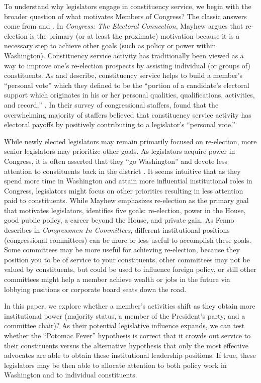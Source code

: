 \documentclass{article}
\begin{document}
To understand why legislators engage in constituency service, we begin with the broader question of what motivates Members of Congress?  The classic answers come from \citet{Mayhew1974} and \citet{Fenno1973}. In \emph{Congress: The Electoral Connection}, Mayhew argues that re-election is the primary (or at least the proximate) motivation because it is a necessary step to achieve other goals (such as policy or power within Washington). Constituency service activity has traditionally been viewed as a way to improve one's re-election prospects by assisting individual (or groups of) constituents.  As \citet*{CainFerejohnFiorina1984} and \citet*{CainFerejohnFiorina1987} describe, constituency service helps to build a member's ``personal vote'' which they defined to be the ``portion of a candidate's electoral support which originates in his or her personal qualities, qualifications, activities, and record,'' \citep*[][pg. 9]{CainFerejohnFiorina1987}. In their survey of congressional staffers, \citet{CainFerejohnFiorina1987} found that the overwhelming majority of staffers believed that constituency service activity has electoral payoffs by positively contributing to a legislator's ``personal vote.''  

While newly elected legislators may remain primarily focused on re-election, more senior legislators may prioritize other goals. As legislators acquire power in Congress, it is often asserted that they ``go Washington'' and devote less attention to constituents back in the district \citep{Fenno1978}.  It seems intuitive that as they spend more time in Washington and attain more influential institutional roles in Congress, legislators might focus on other priorities resulting in less attention paid to constituents.   While Mayhew emphasizes re-election as the primary goal that motivates legislators, \citet{Fenno1973} identifies five goals: re-election, power in the House, good public policy, a career beyond the House, and private gain.  As Fenno describes in \textit{Congressmen In Committees}, different institutional positions (congressional committees) can be more or less useful to accomplish these goals.  Some committees may be more useful for achieving re-election, because they position you to be of service to your constituents, other committees may not be valued by constituents, but could be used to influence foreign policy, or still other committees might help a member achieve wealth or jobs in the future via lobbying positions or corporate board seats down the road.     

In this paper, we explore whether a member's activities shift as they obtain more institutional power (majority status, a member of the President's party, and a committee chair)?  As their potential legislative influence expands, we can test whether the ``Potomac Fever'' hypothesis is correct that it crowds out service to their constituents versus the alternative hypothesis that only the most effective advocates are able to obtain these institutional leadership positions.  If true, these legislators may be then able to allocate attention to both policy work in Washington and to individual constituents.
\end{document}
